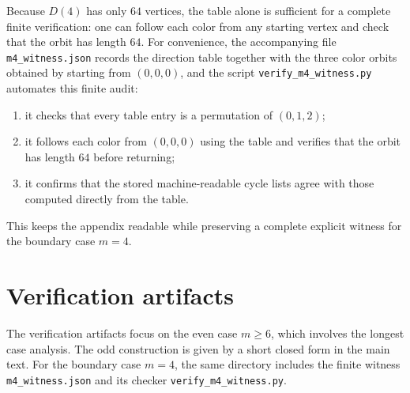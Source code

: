 \documentclass[11pt]{article}
\begin{document}
Because $D(4)$ has only $64$ vertices, the table alone is sufficient for a complete finite verification: one can follow each color from any starting vertex and check that the orbit has length $64$.
For convenience, the accompanying file \texttt{m4\_witness.json} records the direction table together with the three color orbits obtained by starting from $(0,0,0)$, and the script \texttt{verify\_m4\_witness.py} automates this finite audit:
\begin{enumerate}[leftmargin=2.2em]
\item it checks that every table entry is a permutation of $(0,1,2)$;
\item it follows each color from $(0,0,0)$ using the table and verifies that the orbit has length $64$ before returning;
\item it confirms that the stored machine-readable cycle lists agree with those computed directly from the table.
\end{enumerate}
This keeps the appendix readable while preserving a complete explicit witness for the boundary case $m=4$.

\section{Verification artifacts}\label{app:verification}

The verification artifacts focus on the even case $m\ge 6$, which involves the longest case analysis.
The odd construction is given by a short closed form in the main text.
For the boundary case $m=4$, the same directory includes the finite witness \texttt{m4\_witness.json} and its checker \texttt{verify\_m4\_witness.py}.
\end{document}

